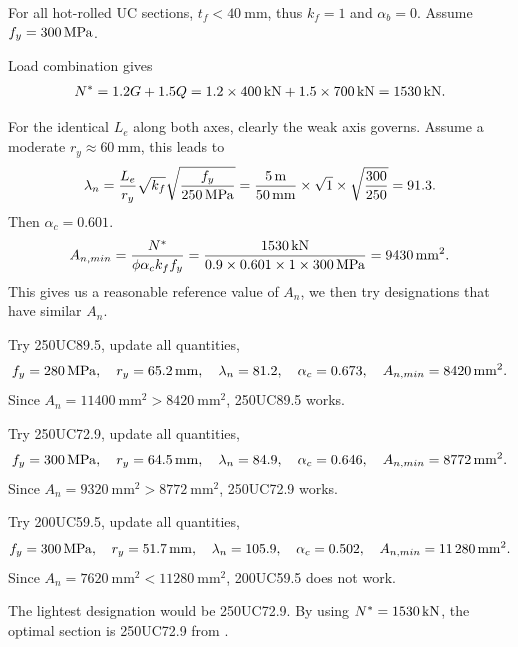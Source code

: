 \begin{solution}
For all hot-rolled UC sections, $t_f<\SI{40}{\mm}$, thus $k_f=1$ and $\alpha_b=0$. Assume $f_y=\SI{300}{\mega\pascal}$.

Load combination gives
\begin{gather*}
N^*=1.2G+1.5Q=1.2\times\SI{400}{\kilo\newton}+1.5\times\SI{700}{\kilo\newton}=\SI{1530}{\kilo\newton}.
\end{gather*}

For the identical $L_e$ along both axes, clearly the weak axis governs. Assume a moderate $r_y\approx\SI{60}{\mm}$, this leads to
\begin{gather*}
\lambda_n=\dfrac{L_e}{r_y}\sqrt{k_f}\sqrt{\dfrac{f_y}{\SI{250}{\mega\pascal}}}=\dfrac{\SI{5}{\meter}}{\SI{50}{\milli\meter}}\times\sqrt{1}\times\sqrt{\dfrac{300}{250}}=91.3.
\end{gather*}
Then $\alpha_c=0.601$.
\begin{gather*}
A_{n,min}=\dfrac{N^*}{\phi\alpha_ck_ff_y}=\dfrac{\SI{1530}{\kilo\newton}}{0.9\times0.601\times1\times\SI{300}{\mega\pascal}}=\SI{9430}{\milli\meter^2}.
\end{gather*}
This gives us a reasonable reference value of $A_n$, we then try designations that have similar $A_n$.

Try 250UC89.5, update all quantities,
\begin{gather*}
f_y=\SI{280}{\mega\pascal},\quad
r_y=\SI{65.2}{\milli\meter},\quad
\lambda_n=81.2,\quad
\alpha_c=0.673,\quad
A_{n,min}=\SI{8420}{\milli\meter^2}.
\end{gather*}
Since $A_n=\SI{11400}{\mm^2}>\SI{8420}{\mm^2}$, 250UC89.5 works.

Try 250UC72.9, update all quantities,
\begin{gather*}
f_y=\SI{300}{\mega\pascal},\quad
r_y=\SI{64.5}{\milli\meter},\quad
\lambda_n=84.9,\quad
\alpha_c=0.646,\quad
A_{n,min}=\SI{8772}{\milli\meter^2}.
\end{gather*}
Since $A_n=\SI{9320}{\mm^2}>\SI{8772}{\mm^2}$, 250UC72.9 works.

Try 200UC59.5, update all quantities,
\begin{gather*}
f_y=\SI{300}{\mega\pascal},\quad
r_y=\SI{51.7}{\milli\meter},\quad
\lambda_n=105.9,\quad
\alpha_c=0.502,\quad
A_{n,min}=\SI{11280}{\milli\meter^2}.
\end{gather*}
Since $A_n=\SI{7620}{\mm^2}<\SI{11280}{\mm^2}$, 200UC59.5 does not work.

The lightest designation would be 250UC72.9. By using $N^*=\SI{1530}{\kilo\newton}$, the optimal section is 250UC72.9 from .
\end{solution}

